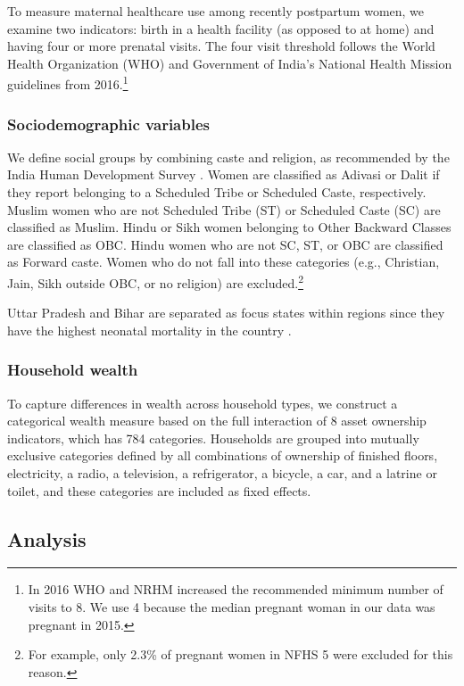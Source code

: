 \documentclass[10pt,twoside,reqno]{article}
\begin{document}
To measure maternal healthcare use among recently postpartum women, we examine two indicators: birth in a health facility (as opposed to at home) and having four or more prenatal visits. The four visit threshold follows the World Health Organization (WHO) and Government of India’s National Health Mission guidelines from 2016.\footnote{In 2016 WHO and NRHM increased the recommended minimum number of visits to 8.  We use 4 because the median pregnant woman in our data was pregnant in 2015.}

\subsubsection*{Sociodemographic variables}  

We define social groups by combining caste and religion, as recommended by the India Human Development Survey \citep{desai2008india}. Women are classified as Adivasi or Dalit if they report belonging to a Scheduled Tribe or Scheduled Caste, respectively. Muslim women who are not Scheduled Tribe (ST) or Scheduled Caste (SC) are classified as Muslim. Hindu or Sikh women belonging to Other Backward Classes are classified as OBC. Hindu women who are not SC, ST, or OBC are classified as Forward caste. Women who do not fall into these categories (e.g., Christian, Jain, Sikh outside OBC, or no religion) are excluded.\footnote{For example, only 2.3\% of pregnant women in NFHS 5 were excluded for this reason.} 

Uttar Pradesh and Bihar are separated as focus states within regions since they have the highest neonatal mortality in the country \citep{coffey2025excess}. 

\subsubsection*{Household wealth} \label{sec:wealthcontrols}

To capture differences in wealth across household types, we construct a categorical wealth measure based on the full interaction of 8 asset ownership indicators, which has 784 categories. Households are grouped into mutually exclusive categories defined by all combinations of ownership of finished floors, electricity, a radio, a television, a refrigerator, a bicycle, a car, and a latrine or toilet, and these categories are included as fixed effects.

\subsection*{Analysis}
\end{document}
